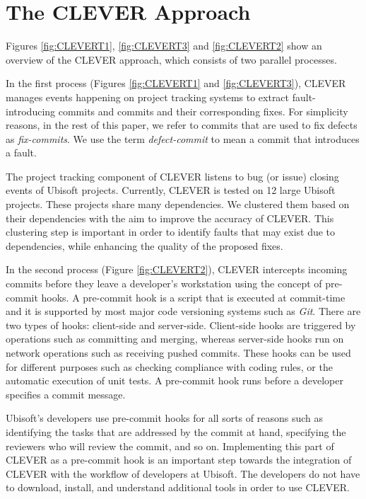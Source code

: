 \documentclass[sigconf]{acmart}
\begin{document}
\section{The CLEVER Approach}\label{sec:CLEVERT}

Figures \ref{fig:CLEVERT1}, \ref{fig:CLEVERT3} and \ref{fig:CLEVERT2}
show an overview of the CLEVER approach, which consists of two parallel
processes.

In the first process (Figures \ref{fig:CLEVERT1} and
\ref{fig:CLEVERT3}), CLEVER manages events happening on project tracking
systems to extract fault-introducing commits and commits and their
corresponding fixes. For simplicity reasons, in the rest of this paper,
we refer to commits that are used to fix defects as \emph{fix-commits}.
We use the term \emph{defect-commit} to mean a commit that introduces a
fault.

The project tracking component of CLEVER listens to bug (or issue)
closing events of Ubisoft projects. Currently, CLEVER is tested on 12
large Ubisoft projects. These projects share many dependencies. We
clustered them based on their dependencies with the aim to improve the
accuracy of CLEVER. This clustering step is important in order to
identify faults that may exist due to dependencies, while enhancing the
quality of the proposed fixes.



In the second process (Figure \ref{fig:CLEVERT2}), CLEVER intercepts
incoming commits before they leave a developer's workstation using the
concept of pre-commit hooks. A pre-commit hook is a script that is
executed at commit-time and it is supported by most major code
versioning systems such as \emph{Git}. There are two types of hooks:
client-side and server-side. Client-side hooks are triggered by
operations such as committing and merging, whereas server-side hooks run
on network operations such as receiving pushed commits. These hooks can
be used for different purposes such as checking compliance with coding
rules, or the automatic execution of unit tests. A pre-commit hook runs
before a developer specifies a commit message.

Ubisoft's developers use pre-commit hooks for all sorts of reasons such
as identifying the tasks that are addressed by the commit at hand,
specifying the reviewers who will review the commit, and so on.
Implementing this part of CLEVER as a pre-commit hook is an important
step towards the integration of CLEVER with the workflow of developers
at Ubisoft. The developers do not have to download, install, and
understand additional tools in order to use CLEVER.
\end{document}
